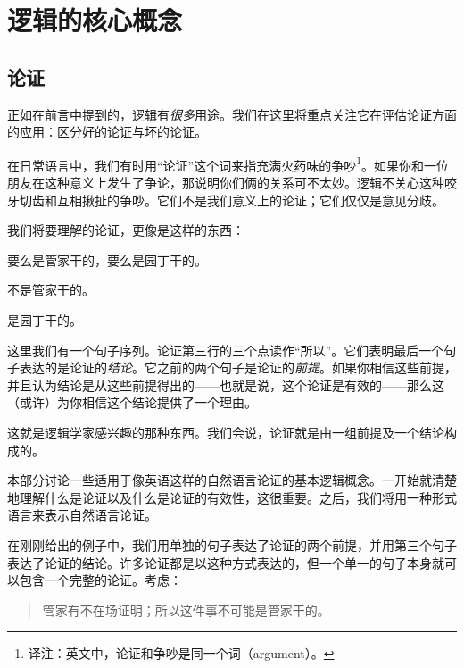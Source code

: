 \part{逻辑的核心概念}
\label{ch.intro}

\chapter{论证}
\label{s:Arguments}

正如在\hyperref[preface]{前言}中提到的，逻辑有\emph{很多}用途。我们在这里将重点关注它在评估论证方面的应用：区分好的论证与坏的论证。

在日常语言中，我们有时用“论证”这个词来指充满火药味的争吵\footnote{译注：英文中，论证和争吵是同一个词（argument）。}。如果你和一位朋友在这种意义上发生了争论，那说明你们俩的关系可不太妙。逻辑不关心这种咬牙切齿和互相揪扯的争吵。它们不是我们意义上的论证；它们仅仅是意见分歧。

我们将要理解的论证，更像是这样的东西：


\begin{earg}\label{argButlerGardner}
		\item 要么是管家干的，要么是园丁干的。
		\item 不是管家干的。
		\item[\texttherefore] 是园丁干的。
	\end{earg}


这里我们有一个句子序列。论证第三行的三个点读作“所以”。它们表明最后一个句子表达的是论证的\emph{结论}。它之前的两个句子是论证的\emph{前提}。如果你相信这些前提，并且认为结论是从这些前提得出的——也就是说，这个论证是有效的——那么这（或许）为你相信这个结论提供了一个理由。

这就是逻辑学家感兴趣的那种东西。我们会说，论证就是由一组前提及一个结论构成的。

本部分讨论一些适用于像英语这样的自然语言论证的基本逻辑概念。一开始就清楚地理解什么是论证以及什么是论证的有效性，这很重要。之后，我们将用一种形式语言来表示自然语言论证。 %

在刚刚给出的例子中，我们用单独的句子表达了论证的两个前提，并用第三个句子表达了论证的结论。许多论证都是以这种方式表达的，但一个单一的句子本身就可以包含一个完整的论证。考虑：


\begin{quote}
		 管家有不在场证明；所以这件事不可能是管家干的。
	\end{quote}


